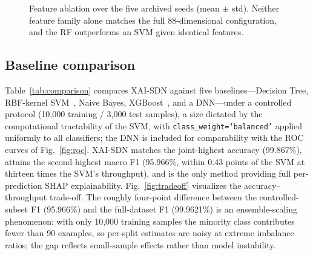 ﻿\documentclass[journal]{IEEEtran}
\begin{document}
\begin{figure}[!t]
\centering
{}
\caption{Feature ablation over the five archived seeds (mean $\pm$ std). Neither feature family alone matches the full 88-dimensional configuration, and the RF outperforms an SVM given identical features.}
\label{fig:ablation}
\end{figure}

\subsection{Baseline comparison}
Table~\ref{tab:comparison} compares XAI-SDN against five baselines---Decision Tree, RBF-kernel SVM~\cite{cortes1995svm}, Naive Bayes, XGBoost~\cite{chen2016xgboost}, and a DNN---under a controlled protocol (10,000 training / 3,000 test samples), a size dictated by the computational tractability of the SVM, with \texttt{class\_weight=`balanced'} applied uniformly to all classifiers; the DNN is included for comparability with the ROC curves of Fig.~\ref{fig:roc}. XAI-SDN matches the joint-highest accuracy (99.867\%), attains the second-highest macro F1 (95.966\%, within 0.43 points of the SVM at thirteen times the SVM's throughput), and is the only method providing full per-prediction SHAP explainability. Fig.~\ref{fig:tradeoff} visualizes the accuracy--throughput trade-off. The roughly four-point difference between the controlled-subset F1 (95.966\%) and the full-dataset F1 (99.9621\%) is an ensemble-scaling phenomenon: with only 10,000 training samples the minority class contributes fewer than 90 examples, so per-split estimates are noisy at extreme imbalance ratios; the gap reflects small-sample effects rather than model instability.
\end{document}
